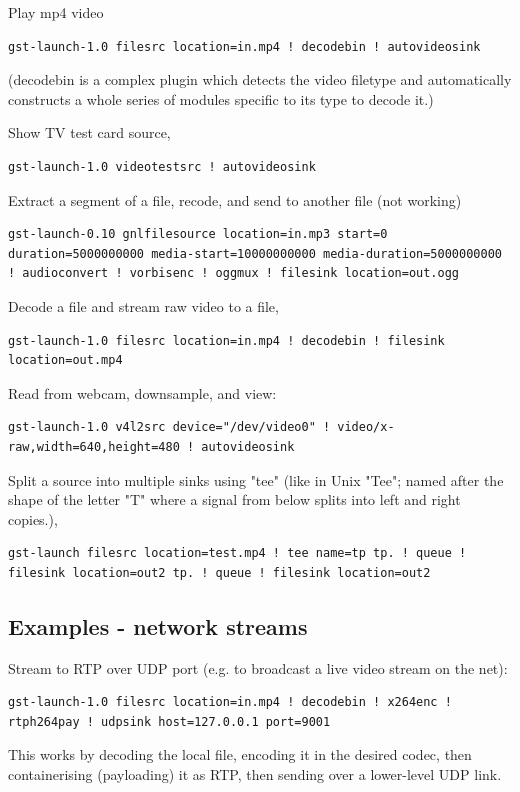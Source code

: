 \documentclass[oneside,english]{scrbook}
\begin{document}
Play mp4 video 
\begin{lstlisting}
gst-launch-1.0 filesrc location=in.mp4 ! decodebin ! autovideosink
\end{lstlisting}
(decodebin is a complex plugin which detects the video filetype and automatically constructs a whole series of modules specific to its type to decode it.)

Show TV test card source,
\begin{lstlisting}
gst-launch-1.0 videotestsrc ! autovideosink
\end{lstlisting}

Extract a segment of a file, recode, and send to another file (not
working) 

\begin{lstlisting}
gst-launch-0.10 gnlfilesource location=in.mp3 start=0
duration=5000000000 media-start=10000000000 media-duration=5000000000
! audioconvert ! vorbisenc ! oggmux ! filesink location=out.ogg
\end{lstlisting}

Decode a file and stream raw video to a file, 
\begin{lstlisting}
gst-launch-1.0 filesrc location=in.mp4 ! decodebin ! filesink location=out.mp4
\end{lstlisting}

Read from webcam, downsample, and view:
\begin{lstlisting}
gst-launch-1.0 v4l2src device="/dev/video0" ! video/x-raw,width=640,height=480 ! autovideosink
\end{lstlisting}

Split a source into multiple sinks using "tee" (like in Unix "Tee"; named after the shape of the letter "T" where a signal from below splits into left and right copies.),

\begin{lstlisting}
gst-launch filesrc location=test.mp4 ! tee name=tp tp. ! queue ! filesink location=out2 tp. ! queue ! filesink location=out2
\end{lstlisting}

\subsection{Examples - network streams}

Stream to RTP over UDP port (e.g. to broadcast a live video stream on the net):
\begin{lstlisting}
gst-launch-1.0 filesrc location=in.mp4 ! decodebin ! x264enc ! rtph264pay ! udpsink host=127.0.0.1 port=9001
\end{lstlisting}
This works by decoding the local file, encoding it in the desired codec, then containerising (payloading) it as RTP, then sending over a lower-level UDP link.
\end{document}
